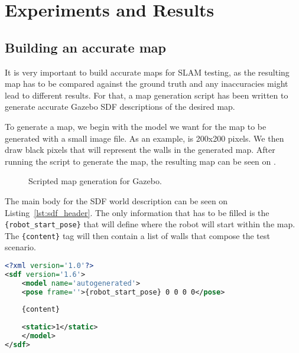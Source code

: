 \chapter{Experiments and Results}\label{chp:results}

\section{Building an accurate map}

It is very important to build accurate maps for SLAM testing, as the resulting map has to be compared against the ground truth and any inaccuracies might lead to different results. For that, a map generation script has been written to generate accurate Gazebo SDF descriptions of the desired map.

To generate a map, we begin with the model we want for the map to be generated with a small image file. As an example,  is 200x200 pixels. We then draw black pixels that will represent the walls in the generated map. After running the script to generate the map, the resulting map can be seen on .

\begin{figure}[!ht]
     \centering
     \hfill
     \caption{Scripted map generation for Gazebo.}
     \label{fig:map_generation_script}
\end{figure}

The main body for the SDF world description can be seen on Listing~\ref{lst:sdf_header}. The only information that has to be filled is the \texttt{\{robot\_start\_pose\}} that will define where the robot will start within the map. The \texttt{\{content\}} tag will then contain a list of walls that compose the test scenario.

\begin{lstlisting}[caption={SDF Header.},label={lst:sdf_header},language=XML]
<?xml version='1.0'?>
<sdf version='1.6'>
    <model name='autogenerated'>
    <pose frame=''>{robot_start_pose} 0 0 0 0</pose>
    
    {content}
    
    <static>1</static>
    </model>
</sdf>
\end{lstlisting} \label{lst:1}

